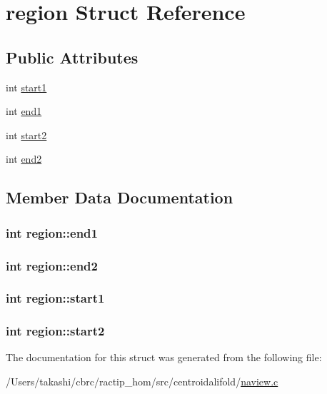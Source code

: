 \hypertarget{structregion}{\section{region Struct Reference}
\label{structregion}
}
\subsection*{Public Attributes}
\begin{DoxyCompactItemize}
\item 
int \hyperlink{structregion_a9491ab5c4e5be6d5cef854f71a75cf19}{start1}
\item 
int \hyperlink{structregion_adbc1820d966add5e3de8471acefee043}{end1}
\item 
int \hyperlink{structregion_a04cb81f51b93d18f3899b4172ea90dc2}{start2}
\item 
int \hyperlink{structregion_af19b594ce7c48d1b6c459351d4da5639}{end2}
\end{DoxyCompactItemize}


\subsection{Member Data Documentation}
\hypertarget{structregion_adbc1820d966add5e3de8471acefee043}{
\subsubsection[{end1}]{\setlength{\rightskip}{0pt plus 5cm}int region\+::end1}}\label{structregion_adbc1820d966add5e3de8471acefee043}
\hypertarget{structregion_af19b594ce7c48d1b6c459351d4da5639}{
\subsubsection[{end2}]{\setlength{\rightskip}{0pt plus 5cm}int region\+::end2}}\label{structregion_af19b594ce7c48d1b6c459351d4da5639}
\hypertarget{structregion_a9491ab5c4e5be6d5cef854f71a75cf19}{
\subsubsection[{start1}]{\setlength{\rightskip}{0pt plus 5cm}int region\+::start1}}\label{structregion_a9491ab5c4e5be6d5cef854f71a75cf19}
\hypertarget{structregion_a04cb81f51b93d18f3899b4172ea90dc2}{
\subsubsection[{start2}]{\setlength{\rightskip}{0pt plus 5cm}int region\+::start2}}\label{structregion_a04cb81f51b93d18f3899b4172ea90dc2}


The documentation for this struct was generated from the following file\+:\begin{DoxyCompactItemize}
\item 
/\+Users/takashi/cbrc/ractip\+\_\+hom/src/centroidalifold/\hyperlink{naview_8c}{naview.\+c}\end{DoxyCompactItemize}
